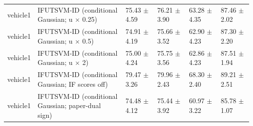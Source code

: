 \begin{table}[!t]
{\begin{tabular}{llllll}
vehicle1 & \shortstack[l]{IFUTSVM-ID (conditional\\Gaussian; u \(\times\) 0.25)} & 75.43 \(\pm\) 4.59 & 76.21 \(\pm\) 3.90 & 63.28 \(\pm\) 4.35 & 87.46 \(\pm\) 2.02 \\
vehicle1 & \shortstack[l]{IFUTSVM-ID (conditional\\Gaussian; u \(\times\) 0.5)} & 74.91 \(\pm\) 4.19 & 75.66 \(\pm\) 3.52 & 62.90 \(\pm\) 4.23 & 87.30 \(\pm\) 2.20 \\
vehicle1 & \shortstack[l]{IFUTSVM-ID (conditional\\Gaussian; u \(\times\) 2)} & 75.00 \(\pm\) 4.24 & 75.75 \(\pm\) 3.56 & 62.86 \(\pm\) 4.23 & 87.51 \(\pm\) 1.94 \\
vehicle1 & \shortstack[l]{IFUTSVM-ID (conditional\\Gaussian; IF scores off)} & 79.47 \(\pm\) 3.26 & 79.96 \(\pm\) 2.43 & 68.30 \(\pm\) 2.40 & 89.21 \(\pm\) 2.51 \\
vehicle1 & \shortstack[l]{IFUTSVM-ID (conditional\\Gaussian; paper-dual\\sign)} & 74.48 \(\pm\) 4.12 & 75.44 \(\pm\) 3.92 & 60.97 \(\pm\) 3.22 & 85.78 \(\pm\) 1.07 \\
\hline
\end{tabular}%
}
\end{table}

